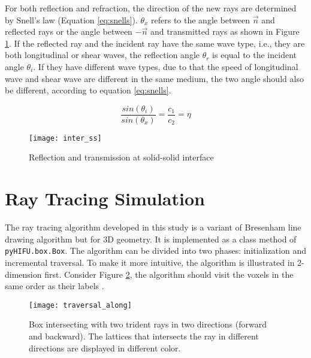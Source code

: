 For both reflection and refraction, the direction of the new rays are determined by Snell's law (Equation \ref{eq:snells}). $\theta_x$ refers to the angle between $\vec{n}$ and reflected rays or the angle between $-\vec{n}$ and transmitted rays as shown in Figure \ref{fig:inter_ss}. If the reflected ray and the incident ray have the same wave type, i.e., they are both longitudinal or shear waves, the reflection angle $\theta_{r}$ is equal to the incident angle $\theta_i$. If they have different wave types, due to that the speed of longitudinal wave and shear wave are different in the same medium, the two angle should also be different, according to equation \ref{eq:snells}.

\begin{equation} \label{eq:snells}
    \frac{sin(\theta_i)}{sin(\theta_{x})} = \frac{c_1}{c_2}=\eta
\end{equation}

\begin{figure}[h]
    \centering
    \texttt{[image: inter\_ss]}
    \caption{Reflection and transmission at solid-solid interface}
    \label{fig:inter_ss}
\end{figure}

\section{Ray Tracing Simulation} \label{sec:ray_tracing}

The ray tracing algorithm developed in this study is a variant of Bresenham line drawing algorithm \cite{bresenham} but for 3D geometry. It is implemented as a class method of \texttt{pyHIFU.box.Box}. The algorithm can be divided into two phases: initialization and incremental traversal. To make it more intuitive, the algorithm is illustrated in 2-dimension first. Consider Figure \ref{fig:traversal_along}, the algorithm should visit the voxels in the same order as their labels \cite{wooraytracing}.

\begin{figure}[h]
    \centering
    \texttt{[image: traversal\_along]}
    \caption{Box intersecting with two trident rays in two directions (forward and backward). The lattices that intersects the ray in different directions are displayed in different color.}
    \label{fig:traversal_along}
\end{figure}

